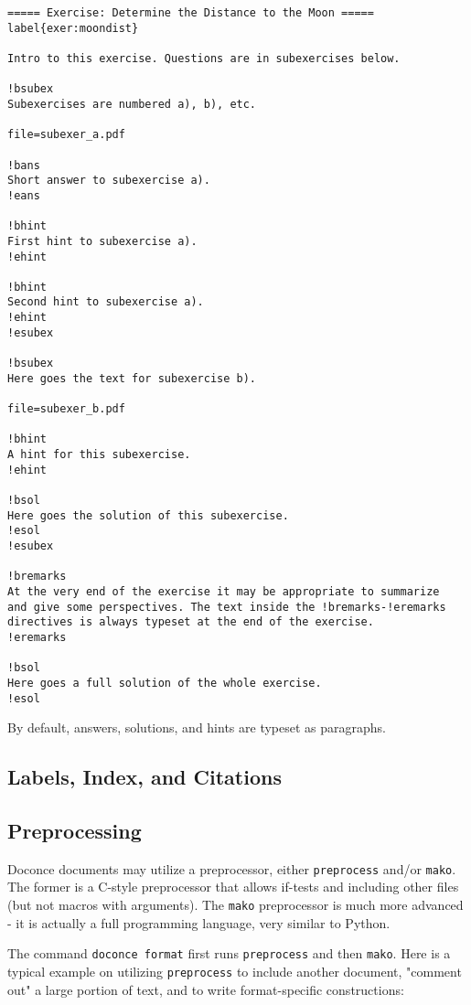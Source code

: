 \documentclass[twoside]{article}
\begin{document}
\begin{Verbatim}
===== Exercise: Determine the Distance to the Moon =====
label{exer:moondist}

Intro to this exercise. Questions are in subexercises below.

!bsubex
Subexercises are numbered a), b), etc.

file=subexer_a.pdf

!bans
Short answer to subexercise a).
!eans

!bhint
First hint to subexercise a).
!ehint

!bhint
Second hint to subexercise a).
!ehint
!esubex

!bsubex
Here goes the text for subexercise b).

file=subexer_b.pdf

!bhint
A hint for this subexercise.
!ehint

!bsol
Here goes the solution of this subexercise.
!esol
!esubex

!bremarks
At the very end of the exercise it may be appropriate to summarize
and give some perspectives. The text inside the !bremarks-!eremarks
directives is always typeset at the end of the exercise.
!eremarks

!bsol
Here goes a full solution of the whole exercise.
!esol

\end{Verbatim}
By default, answers, solutions, and hints are typeset as paragraphs.

\subsection{Labels, Index, and Citations}

\subsection{Preprocessing}

Doconce documents may utilize a preprocessor, either {\fontsize{10pt}{10pt}\verb!preprocess!} and/or
{\fontsize{10pt}{10pt}\verb!mako!}. The former is a C-style preprocessor that allows if-tests
and including other files (but not macros with arguments).
The {\fontsize{10pt}{10pt}\verb!mako!} preprocessor is much more advanced - it is actually a full
programming language, very similar to Python.

The command {\fontsize{10pt}{10pt}\verb!doconce format!} first runs {\fontsize{10pt}{10pt}\verb!preprocess!} and then {\fontsize{10pt}{10pt}\verb!mako!}.
Here is a typical example on utilizing {\fontsize{10pt}{10pt}\verb!preprocess!} to include another
document, "comment out" a large portion of text, and to write format-specific
constructions:
\end{document}
